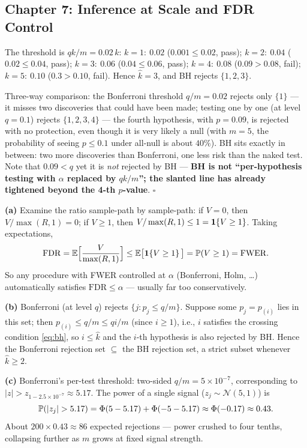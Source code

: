 \subsection{Chapter 7: Inference at Scale and FDR Control}

\begin{description}[style=nextline, itemsep=1.2ex]
\item[Exercise \ref{ex:bh-hand} (BH by hand)]
The threshold is $qk/m = 0.02\,k$: $k=1{:}\ 0.02$ ($0.001 \le 0.02$, pass); $k=2{:}\ 0.04$ ($0.02 \le 0.04$, pass); $k=3{:}\ 0.06$ ($0.04 \le 0.06$, pass); $k=4{:}\ 0.08$ ($0.09 > 0.08$, fail); $k=5{:}\ 0.10$ ($0.3 > 0.10$, fail). Hence $\hat{k} = 3$, and BH rejects $\{1, 2, 3\}$.

Three-way comparison: the Bonferroni threshold $q/m = 0.02$ rejects only $\{1\}$ --- it misses two discoveries that could have been made; testing one by one (at level $q=0.1$) rejects $\{1,2,3,4\}$ --- the fourth hypothesis, with $p=0.09$, is rejected with no protection, even though it is very likely a null (with $m=5$, the probability of seeing $p \le 0.1$ under all-null is about $40\%$). BH sits exactly in between: two more discoveries than Bonferroni, one less risk than the naked test. Note that $0.09 < q$ yet it is \textit{not} rejected by BH --- \textbf{BH is not ``per-hypothesis testing with $\alpha$ replaced by $qk/m$''; the slanted line has already tightened beyond the 4-th $p$-value}. $\square$

\item[Exercise \ref{ex:bh-bonf} (FDR vs.\ FWER; the inclusion between the two procedures)]
\textbf{(a)} Examine the ratio sample-path by sample-path: if $V = 0$, then $V/\max(R,1) = 0$; if $V \ge 1$, then $V/\max(R,1) \le 1 = \mathbf{1}\!\left\{V \ge 1\right\}$. Taking expectations,
\[
  \mathrm{FDR} = \mathbb{E}\Big[\frac{V}{\max(R,1)}\Big] \le \mathbb{E}\big[\mathbf{1}\!\left\{V \ge 1\right\}\big] = \mathbb{P}(V \ge 1) = \mathrm{FWER}.
\]
So any procedure with FWER controlled at $\alpha$ (Bonferroni, Holm, \dots) automatically satisfies $\mathrm{FDR} \le \alpha$ --- usually far too conservatively.

\textbf{(b)} Bonferroni (at level $q$) rejects $\{ j : p_j \le q/m \}$. Suppose some $p_j = p_{(i)}$ lies in this set; then $p_{(i)} \le q/m \le q i/m$ (since $i \ge 1$), i.e., $i$ satisfies the crossing condition \eqref{eq:bh}, so $i \le \hat{k}$ and the $i$-th hypothesis is also rejected by BH. Hence the Bonferroni rejection set $\subseteq$ the BH rejection set, a strict subset whenever $\hat{k} \ge 2$.

\textbf{(c)} Bonferroni's per-test threshold: two-sided $q/m = 5\times 10^{-7}$, corresponding to $|z| > z_{1-2.5\times10^{-7}} \approx 5.17$. The power of a single signal ($z_j \sim \mathcal{N}(5,1)$) is
\[
  \mathbb{P}(|z_j| > 5.17) = \Phi(5 - 5.17) + \Phi(-5 - 5.17) \approx \Phi(-0.17) \approx 0.43 .
\]
About $200 \times 0.43 \approx 86$ expected rejections --- power crushed to four tenths, collapsing further as $m$ grows at fixed signal strength.


\end{description}
